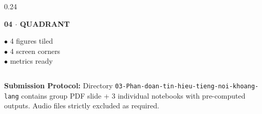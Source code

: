 \documentclass[aspectratio=169, 10pt]{beamer}
\begin{document}
\begin{frame}
\begin{tcolorbox}[contentframe]
\begin{columns}[T]
    \begin{column}{0.24\textwidth}
      \begin{tcolorbox}[mintcard, height=2.30cm, valign=top]
        \centering
        {\fontsize{9pt}{10pt}\selectfont\color{mintGreen}\textbf{04 $\cdot$ QUADRANT}}\\[3pt]
        \raggedright{\fontsize{7.5pt}{9pt}\selectfont
        $\bullet$ 4 figures tiled\\[2pt]
        $\bullet$ 4 screen corners\\[2pt]
        $\bullet$ metrics ready}
      \end{tcolorbox}
    \end{column}
  \end{columns}

  \vspace{8pt}
  \begin{tcolorbox}[glowcard]
    {\fontsize{8.5pt}{10pt}\selectfont\color{cyanGlow}\textbf{Submission Protocol:}}
    {\fontsize{8pt}{9.5pt}\selectfont
    Directory \texttt{03-Phan-doan-tin-hieu-tieng-noi-khoang-lang} contains group PDF slide + 3 individual notebooks with pre-computed outputs. Audio files strictly excluded as required.}
  \end{tcolorbox}
  \end{tcolorbox}
\end{frame}

\end{document}
